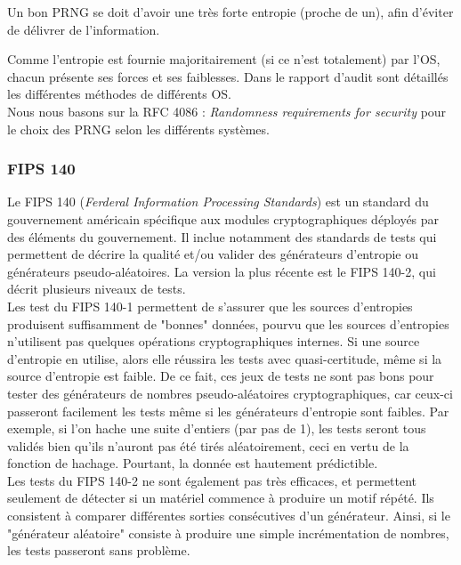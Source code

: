 Un bon PRNG se doit d'avoir une très forte entropie (proche de un), afin d'éviter de délivrer de l'information.

Comme l'entropie est fournie majoritairement (si ce n'est totalement) par l'OS, chacun présente ses forces et ses faiblesses. Dans le rapport d'audit sont détaillés les différentes méthodes de différents OS.\\
		
Nous nous basons sur la RFC 4086 \cite{rfc4086}: \textit{Randomness requirements for security} pour le choix des PRNG selon les différents systèmes.	
	
	\subsubsection{FIPS 140}
Le FIPS 140 (\textit{Ferderal Information Processing Standards}) est un standard du gouvernement américain spécifique aux modules cryptographiques déployés par des éléments du gouvernement. Il inclue notamment des standards de tests qui permettent de décrire la qualité et/ou valider des générateurs d'entropie ou générateurs pseudo-aléatoires. La version la plus récente est le FIPS 140-2, qui décrit plusieurs niveaux de tests.\\
		
		
		Les test du FIPS 140-1 permettent de s'assurer que les sources d'entropies produisent suffisamment de "bonnes" données, pourvu que les sources d'entropies n'utilisent pas quelques opérations cryptographiques internes. Si une source d'entropie en utilise, alors elle réussira les tests avec quasi-certitude, même si la source d'entropie est faible. De ce fait, ces jeux de tests ne sont pas bons pour tester des générateurs de nombres pseudo-aléatoires cryptographiques, car ceux-ci passeront facilement les tests même si les générateurs d'entropie sont faibles. Par exemple, si l'on hache une suite d'entiers (par pas de 1), les tests seront tous validés bien qu'ils n'auront pas été tirés aléatoirement, ceci en vertu de la fonction de hachage. Pourtant, la donnée est hautement prédictible.\\
		
		
		Les tests du FIPS 140-2 ne sont également pas très efficaces, et permettent seulement de détecter si un matériel commence à produire un motif répété. Ils consistent à comparer différentes sorties consécutives d'un générateur. Ainsi, si le "générateur aléatoire" consiste à produire une simple incrémentation de nombres, les tests passeront sans problème.\\
		
